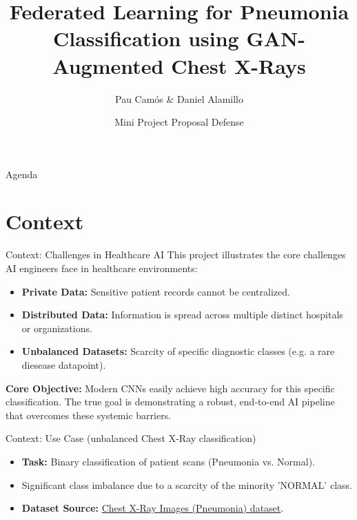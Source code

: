 \documentclass[aspectratio=169]{iticslides}
\title{Federated Learning for Pneumonia Classification using GAN-Augmented Chest X-Rays}
\author{Pau Camós \& Daniel Alamillo}
\institute{Universitat Politècnica de Catalunya}
\date{Mini Project Proposal Defense}
\begin{document}
\begin{frame}
  \titlepage
\end{frame}

\begin{frame}{Agenda}
  \tableofcontents
\end{frame}

\section{Context}

\begin{frame}{Context: Challenges in Healthcare AI}
  This project illustrates the core challenges AI engineers face in
  healthcare environments:
  \begin{itemize}
  \item \textbf{Private Data:} Sensitive patient records cannot be centralized.
  \item \textbf{Distributed Data:} Information is spread across
    multiple distinct hospitals or organizations.
  \item \textbf{Unbalanced Datasets:} Scarcity of specific
    diagnostic classes (e.g. a rare diesease datapoint).
  \end{itemize}
  
  \textbf{Core Objective:} Modern CNNs easily achieve high accuracy
  for this specific classification. The true goal is
  demonstrating a robust, end-to-end AI pipeline that overcomes
  these systemic barriers.
\end{frame}

\begin{frame}{Context: Use Case (unbalanced Chest X-Ray classification)}
  \begin{itemize}
  \item \textbf{Task:} Binary classification of patient
    scans (Pneumonia vs. Normal).
    \vspace{0.3cm}
  \item Significant class imbalance due to a scarcity of the minority
    'NORMAL' class.
    
    \vspace{0.3cm}
    
  \item \textbf{Dataset Source:} \href{https://www.kaggle.com/datasets/paultimothymooney/chest-xray-pneumonia}{Chest X-Ray Images (Pneumonia) dataset}.
  \end{itemize}
\end{frame}
\end{document}

